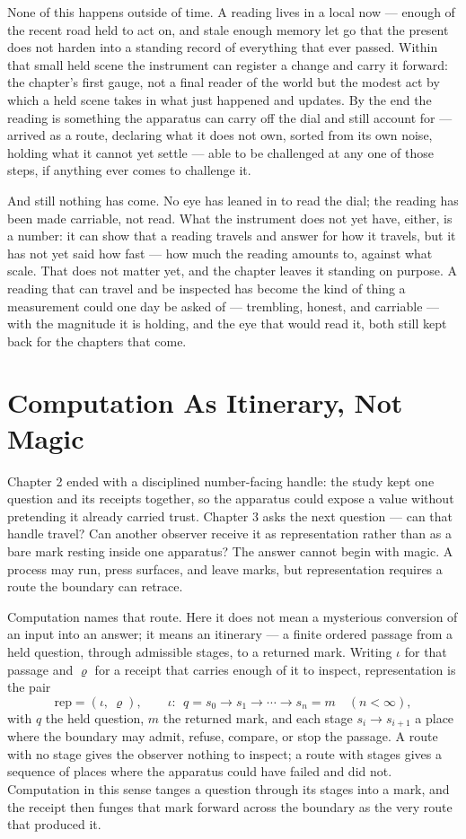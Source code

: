 None of this happens outside of time. A reading lives in a local now --- enough of the recent road held to act on, and stale enough memory let go that the present does not harden into a standing record of everything that ever passed. Within that small held scene the instrument can register a change and carry it forward: the chapter's first gauge, not a final reader of the world but the modest act by which a held scene takes in what just happened and updates. By the end the reading is something the apparatus can carry off the dial and still account for --- arrived as a route, declaring what it does not own, sorted from its own noise, holding what it cannot yet settle --- able to be challenged at any one of those steps, if anything ever comes to challenge it.

And still nothing has come. No eye has leaned in to read the dial; the reading has been made carriable, not read. What the instrument does not yet have, either, is a number: it can show that a reading travels and answer for how it travels, but it has not yet said how fast --- how much the reading amounts to, against what scale. That does not matter yet, and the chapter leaves it standing on purpose. A reading that can travel and be inspected has become the kind of thing a measurement could one day be asked of --- trembling, honest, and carriable --- with the magnitude it is holding, and the eye that would read it, both still kept back for the chapters that come.

\section{Computation As Itinerary, Not Magic}

Chapter 2 ended with a disciplined number-facing handle: the study kept one question and its receipts together, so the apparatus could expose a value without pretending it already carried trust. Chapter 3 asks the next question --- can that handle travel? Can another observer receive it as representation rather than as a bare mark resting inside one apparatus? The answer cannot begin with magic. A process may run, press surfaces, and leave marks, but representation requires a route the boundary can retrace.

Computation names that route. Here it does not mean a mysterious conversion of an input into an answer; it means an itinerary --- a finite ordered passage from a held question, through admissible stages, to a returned mark. Writing $\iota$ for that passage and $\varrho$ for a receipt that carries enough of it to inspect, representation is the pair
\[ \mathrm{rep} = (\iota,\ \varrho), \qquad \iota:\ \ q = s_0 \to s_1 \to \cdots \to s_n = m \quad (n < \infty), \]
with $q$ the held question, $m$ the returned mark, and each stage $s_i \to s_{i+1}$ a place where the boundary may admit, refuse, compare, or stop the passage. A route with no stage gives the observer nothing to inspect; a route with stages gives a sequence of places where the apparatus could have failed and did not. Computation in this sense tanges a question through its stages into a mark, and the receipt then funges that mark forward across the boundary as the very route that produced it.

